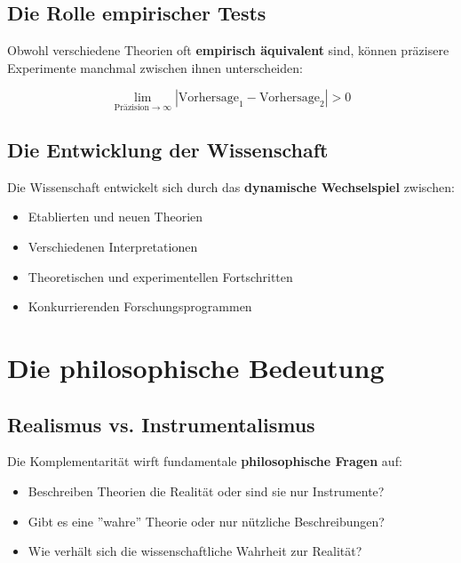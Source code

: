 \documentclass[12pt,a4paper]{report}
\begin{document}
	\subsection{Die Rolle empirischer Tests}
	
	Obwohl verschiedene Theorien oft \textbf{empirisch äquivalent} sind, können präzisere Experimente manchmal zwischen ihnen unterscheiden:
	
	\begin{equation}
		\lim_{\text{Präzision} \to \infty} |\text{Vorhersage}_1 - \text{Vorhersage}_2| > 0
	\end{equation}
	
	\subsection{Die Entwicklung der Wissenschaft}
	
	Die Wissenschaft entwickelt sich durch das \textbf{dynamische Wechselspiel} zwischen:
	
	\begin{itemize}
		\item Etablierten und neuen Theorien
		\item Verschiedenen Interpretationen
		\item Theoretischen und experimentellen Fortschritten
		\item Konkurrierenden Forschungsprogrammen
	\end{itemize}
	
	\section{Die philosophische Bedeutung}
	
	\subsection{Realismus vs. Instrumentalismus}
	
	Die Komplementarität wirft fundamentale \textbf{philosophische Fragen} auf:
	
	\begin{itemize}
		\item Beschreiben Theorien die Realität oder sind sie nur Instrumente?
		\item Gibt es eine ''wahre'' Theorie oder nur nützliche Beschreibungen?
		\item Wie verhält sich die wissenschaftliche Wahrheit zur Realität?
	\end{itemize}
	
\end{document}
